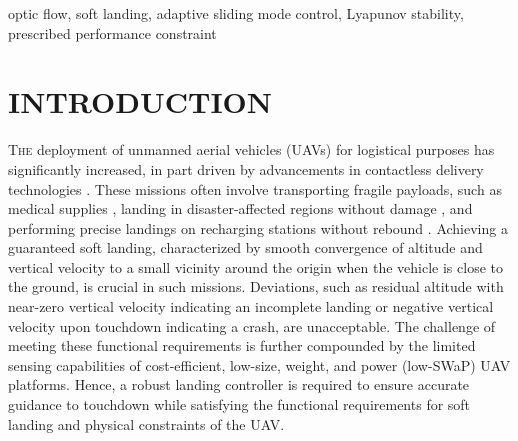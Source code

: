 \documentclass{IEEEtaes}
\begin{document}
\begin{abstract}This paper proposes a novel \emph{scale-independent} adaptive control strategy that allows a quadrotor to rely on optic flow to achieve a soft vertical landing on stationary surfaces. Most prior schemes based on a fixed-gain approach to regulate optic flow suffer from instabilities induced during the vertical landing. To overcome this drawback, this scheme proposes an adaptive sliding mode control strategy with theoretical stability guarantees that incorporates performance and input constraints to achieve desired transient and steady-state performance in the presence of uncertainty arising from wind gusts, ground effects, and possible actuator faults. Lyapunov stability analysis is undertaken to demonstrate that the optic flow error achieves exponential convergence to a small prescribed bound in steady-state, which is shown to be the key to achieving the functional requirement for soft landing. Extensive experimental results substantiate the efficacy of the proposed strategy using a micro-quadrotor in a controlled environment and demonstrate laterally stabilized soft landing using a mini-quadrotor in a real-world setting with an aggressive descent behavior. Performance comparison studies with an optic flow-based fixed-gain proportional-integral control strategy and an altitude-based vertical velocity control strategy are also included, demonstrating the superior performance of the proposed strategy in comparison with these alternative designs.
\end{abstract}

\begin{IEEEkeywords}optic flow, soft landing, adaptive sliding mode control, Lyapunov stability, prescribed performance constraint
\end{IEEEkeywords}

\section{INTRODUCTION}
T{\scshape he} deployment of unmanned aerial vehicles (UAVs) for logistical purposes has significantly increased, in part driven by advancements in contactless delivery technologies \cite{engesser2023}.
These missions often involve transporting fragile payloads, such as medical supplies \cite{amukele2017}, landing in disaster-affected regions without damage \cite{chowdhury2017}, and performing precise landings on recharging stations without rebound \cite{cocchioni2014}.
Achieving a guaranteed soft landing, characterized by smooth convergence of altitude and vertical velocity to a small vicinity around the origin when the vehicle is close to the ground, is crucial in such missions.
Deviations, such as residual altitude with near-zero vertical velocity indicating an incomplete landing or negative vertical velocity upon touchdown indicating a crash, are unacceptable.
The challenge of meeting these functional requirements is further compounded by the limited sensing capabilities of cost-efficient, low-size, weight, and power (low-SWaP) UAV platforms.
Hence, a robust landing controller is required to ensure accurate guidance to touchdown while satisfying the functional requirements for soft landing and physical constraints of the UAV.
\end{document}
